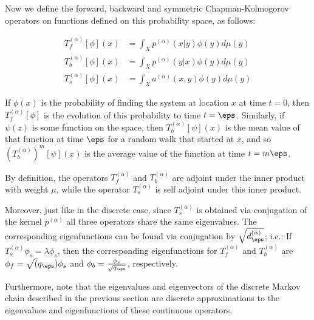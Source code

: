 Now we define the  forward, backward and symmetric Chapman-Kolmogorov operators on functions defined on this probability space, as follows:

\begin{definition}\begin{equation*}\begin{aligned}
T_f^{(\alpha)}[\phi](x) &= \int_X p^{(\alpha)}(x|y)\phi(y)d\mu(y)\\
T_b^{(\alpha)}[\phi](x) &= \int_X p^{(\alpha)}(y|x)\phi(y)d\mu(y)\\
T_s^{(\alpha)}[\phi](x) &= \int_X a^{(\alpha)}(x,y)\phi(y)d\mu(y)
\end{aligned}\end{equation*}\end{definition}

If $\phi(x)$ is the probability of finding the system at location $x$ at time $t = 0$, then $T_f^{(\alpha)}[\phi]$ is the evolution of this probability to time $t = \eps$. Similarly, if $\psi(z)$ is some function on the space, then $T_b^{(\alpha)}[\psi](x)$ is the mean value of that function at time $\eps$ for a random walk that started at $x$, and so $\left(T_b^{(\alpha)}\right)^m[\psi](x)$ is the average value of the function at time $t = m\eps$.

By definition, the operators $T_f^{(\alpha)}$ and $T_b^{(\alpha)}$ are adjoint under the inner product with weight $\mu$, while the operator $T_s^{(\alpha)}$ is self adjoint under this inner product.

Moreover, just like in the discrete case, since $T_s^{(\alpha)}$ is obtained via conjugation of the kernel $p^{(\alpha)}$ all three operators share the same eigenvalues. The corresponding eigenfunctions can be found via
conjugation by $\sqrt{d^{(\alpha)}_\eps}$; i.e.:
If $T_s^{(\alpha)}\phi_s = \lambda\phi_s$, then the corresponding eigenfunctions for $T_f^{(\alpha)}$ and $T_b^{(\alpha)}$ are $\phi_f =
\sqrt(q_\eps)\phi_s$ and $\phi_b = \frac{\phi_s}{\sqrt{q_\eps}}$, respectively.


Furthermore, note that the eigenvalues and eigenvectors of the discrete Markov chain described in the previous section are discrete approximations to the eigenvalues and eigenfunctions of these continuous operators.

